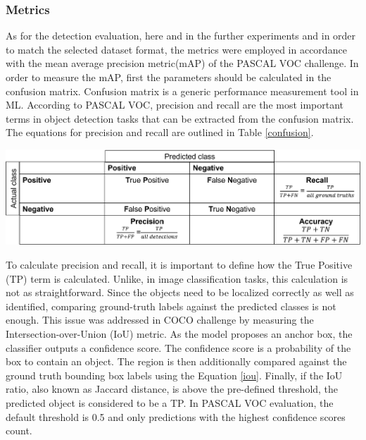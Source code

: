 \subsubsection{Metrics}
\label{metrics_section} 

As for the detection evaluation, here and in the further experiments and in order to match the selected dataset format, the metrics were employed in accordance with the mean average precision metric(mAP) of the PASCAL VOC \cite{Everingham10} challenge. In order to measure the mAP, first the parameters should be calculated in the confusion matrix. Confusion matrix is a generic performance measurement tool in ML. According to PASCAL VOC, precision and recall are the most important terms in object detection tasks that can be extracted from the confusion matrix. The equations for precision and recall are outlined in Table \ref{confusion}.

\begin{table}[htb]
	\begin{center}
		\includegraphics[width=14cm]{./confusion.png}
	\end{center}
	\begin{center}
		\label{confusion}
	\end{center}
\end{table}
\FloatBarrier

To calculate precision and recall, it is important to define how the True Positive (TP) term is calculated. Unlike, in image classification tasks, this calculation is not as straightforward. Since the objects need to be localized correctly as well as identified, comparing ground-truth labels against the predicted classes is not enough. This issue was addressed in COCO challenge \cite{Lin2014} by measuring the Intersection-over-Union (IoU) metric. As the model proposes an anchor box, the classifier outputs a confidence score. The confidence score is a probability of the box to contain an object. The region is then additionally compared against the ground truth bounding box labels using the Equation \ref{iou}. Finally, if the IoU ratio, also known as Jaccard distance, is above the pre-defined threshold, the predicted object is considered to be a TP. In PASCAL VOC evaluation, the default threshold is 0.5 \cite{mAp_blog} and only predictions with the highest confidence scores count. 

